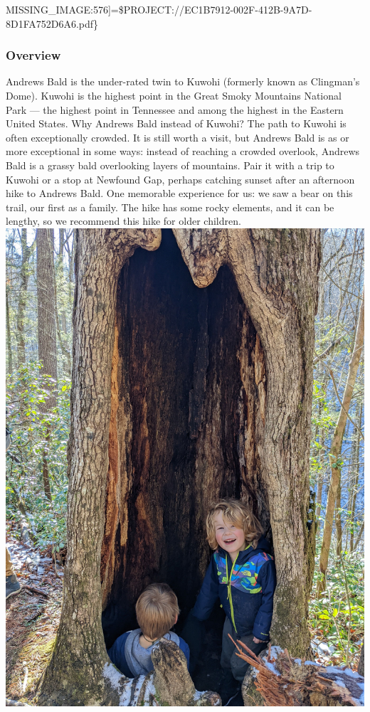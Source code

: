 \documentclass[
  letterpaper,
  DIV=11,
  numbers=noendperiod]{scrartcl}
\begin{document}
MISSING\_IMAGE:576{]}=\$PROJECT://EC1B7912-002F-412B-9A7D-8D1FA752D6A6.pdf\}

\hypertarget{overview-28}{%
\subsubsection{Overview}\label{overview-28}}

Andrews Bald is the under-rated twin to Kuwohi (formerly known as
Clingman's Dome). Kuwohi is the highest point in the Great Smoky
Mountains National Park --- the highest point in Tennessee and among the
highest in the Eastern United States. Why Andrews Bald instead of
Kuwohi? The path to Kuwohi is often exceptionally crowded. It is still
worth a visit, but Andrews Bald is as or more exceptional in some ways:
instead of reaching a crowded overlook, Andrews Bald is a grassy bald
overlooking layers of mountains. Pair it with a trip to Kuwohi or a stop
at Newfound Gap, perhaps catching sunset after an afternoon hike to
Andrews Bald. One memorable experience for us: we saw a bear on this
trail, our first as a family. The hike has some rocky elements, and it
can be lengthy, so we recommend this hike for older children.
\includegraphics{img/trail-27-figure-01.jpg}
\end{document}
